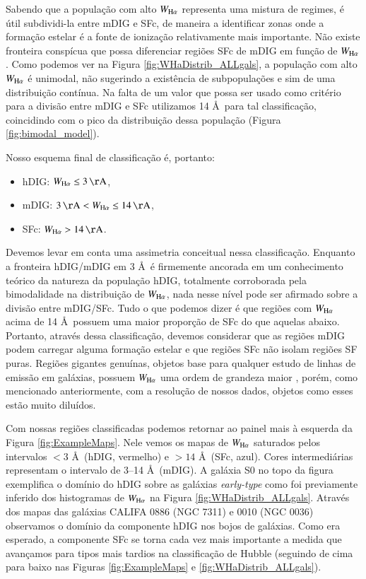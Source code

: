 Sabendo que a população com alto $W_{\Ha}$ representa uma mistura de regimes, é útil subdividi-la entre mDIG e SFc, de maneira a identificar zonas onde a formação estelar é a fonte de ionização relativamente mais importante. Não existe fronteira conspícua que possa diferenciar regiões SFc de mDIG em função de $W_{\Ha}$. Como podemos ver na Figura \ref{fig:WHaDistrib_ALLgals}, a população com alto $W_{\Ha}$ é unimodal, não sugerindo a existência de subpopulações e sim de uma distribuição contínua. Na falta de um valor que possa ser usado como critério para a divisão entre mDIG e SFc utilizamos 14 \AA\ para tal classificação, coincidindo com o pico da distribuição dessa população
(Figura \ref{fig:bimodal_model}).

Nosso esquema final de classificação é, portanto:

\begin{itemize}
 \item hDIG: $W_{\Ha} \le 3 \,\mathrm{\AA}$,
 \item mDIG:  $3 \,\mathrm{\AA}  < W_{\Ha} \le 14 \,\mathrm{\AA}$,
 \item SFc: $W_{\Ha} > 14 \,\mathrm{\AA}$.
\end{itemize}

Devemos levar em conta uma assimetria conceitual nessa classificação. Enquanto a fronteira hDIG/mDIG em 3 \AA\ é firmemente ancorada em um conhecimento teórico da natureza da população hDIG, totalmente corroborada pela bimodalidade na distribuição de $W_{\Ha}$, nada nesse nível pode ser afirmado sobre a divisão entre mDIG/SFc. Tudo o que podemos dizer é que regiões com $W_{\Ha}$ acima de 14 \AA\ possuem uma maior proporção de SFc do que aquelas abaixo. Portanto, através dessa classificação, devemos considerar que as regiões mDIG podem carregar alguma formação estelar e que regiões SFc não isolam regiões SF puras. Regiões \hii gigantes genuínas, objetos base para qualquer estudo de linhas de emissão em galáxias, possuem $W_{\Ha}$ uma ordem de grandeza maior \citep{McCall.etal.1985, Garnett.and.Shields.1987, Kennicutt.and.Garnett.1996, Luridiana.and.Peimbert.2001, Bresolin.etal.2004}, porém, como mencionado anteriormente, com a resolução de nossos dados, objetos como esses estão muito diluídos.

Com nossas regiões classificadas podemos retornar ao painel mais à esquerda da Figura \ref{fig:ExampleMaps}. Nele vemos os mapas de $W_{\Ha}$ saturados pelos intervalos $< 3$ \AA\ (hDIG, vermelho) e $> 14$ \AA\ (SFc, azul). Cores intermediárias representam o intervalo de 3--14 \AA\ (mDIG). A galáxia S0 no topo da figura exemplifica o domínio do hDIG sobre as galáxias {\em early-type} como foi previamente inferido dos histogramas de $W_{\Ha}$ na Figura \ref{fig:WHaDistrib_ALLgals}. Através dos mapas das galáxias CALIFA 0886 (NGC 7311) e  0010 (NGC 0036) observamos o domínio da componente hDIG nos bojos de galáxias. Como era esperado, a componente SFc se torna cada vez mais importante a medida que avançamos para tipos mais tardios na classificação de Hubble (seguindo de cima para baixo nas Figuras \ref{fig:ExampleMaps} e \ref{fig:WHaDistrib_ALLgals}).

